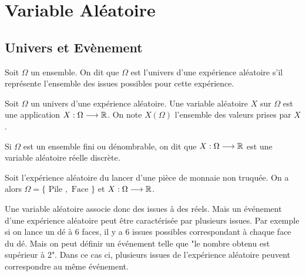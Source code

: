 
\minitoc  %



\section{Variable Aléatoire}

\subsection{Univers et Evènement}

\begin{definition}[Univers]
    Soit $\Omega$ un ensemble. On dit que $\Omega$ est l'univers d'une expérience aléatoire s'il représente 
    l'ensemble des issues possibles pour cette expérience. 
\end{definition}

\begin{definition}
    Soit $\Omega$ un univers d'une expérience aléatoire. Une variable aléatoire $X$ sur $\Omega$ 
    est une application $X : \Omega \longrightarrow \mathbb{R}$. On note $X(\Omega)$ l'ensemble des valeurs prises par $X$. 
\end{definition}

\begin{remark}
    Si $\Omega$ est un ensemble fini ou dénombrable, on dit que $X : \Omega \longrightarrow \mathbb{R}$ est une variable aléatoire réelle discrète. 
\end{remark}

\begin{example}
    Soit l'expérience aléatoire du lancer d'une pièce de monnaie non truquée. 
    On a alors $\Omega = \{\text{ Pile }, \text{ Face }\}$ et $X : \Omega \longrightarrow \mathbb{R}$. 
\end{example}

Une variable aléatoire associe donc des issues à des réels. Mais un événement d'une expérience aléatoire peut être 
caractérisée par plusieurs issues. Par exemple si on lance un dé à 6 faces, il y a 6 issues possibles correspondant 
à chaque face du dé. Mais on peut définir un événement telle que "le nombre obtenu est supérieur à 2". 
Dans ce cas ci, plusieurs issues de l'expérience aléatoire peuvent correspondre au même événement. 

